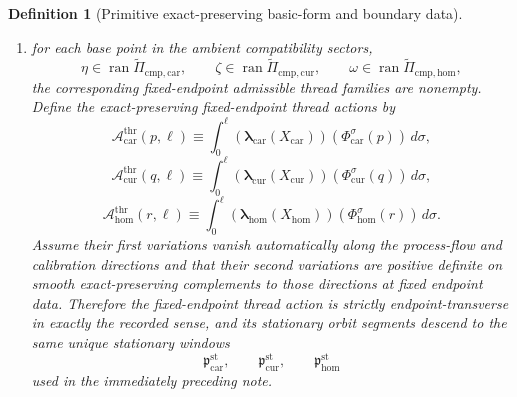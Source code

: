 \documentclass[11pt]{article}
\newcommand{\TensorEqCmpProj}{\widetilde\Pi_{\mathrm{cmp,car}}}
\newcommand{\CurEqCmpProj}{\widetilde\Pi_{\mathrm{cmp,cur}}}
\newcommand{\HomEqCmpProj}{\widetilde\Pi_{\mathrm{cmp,hom}}}
\newcommand{\TensorStationaryWindow}{\mathfrak p_{\mathrm{car}}^{\mathrm{st}}}
\newcommand{\CurStationaryWindow}{\mathfrak p_{\mathrm{cur}}^{\mathrm{st}}}
\newcommand{\HomStationaryWindow}{\mathfrak p_{\mathrm{hom}}^{\mathrm{st}}}
\newcommand{\CurBoundaryRecorder}{\rho_{\mathrm{cur}}^{\partial}}
\newcommand{\HomBoundaryRecorder}{\rho_{\mathrm{hom}}^{\partial}}
\newcommand{\TensorFlowField}{X_{\mathrm{car}}}
\newcommand{\CurFlowField}{X_{\mathrm{cur}}}
\newcommand{\HomFlowField}{X_{\mathrm{hom}}}
\newcommand{\TensorOrbitFlow}{\Phi_{\mathrm{car}}}
\newcommand{\CurOrbitFlow}{\Phi_{\mathrm{cur}}}
\newcommand{\HomOrbitFlow}{\Phi_{\mathrm{hom}}}
\newcommand{\TensorRateForm}{\boldsymbol{\lambda}_{\mathrm{car}}}
\newcommand{\CurRateForm}{\boldsymbol{\lambda}_{\mathrm{cur}}}
\newcommand{\HomRateForm}{\boldsymbol{\lambda}_{\mathrm{hom}}}
\newcommand{\CurBoundarySource}{\boldsymbol{\rho}_{\mathrm{cur}}^{\partial}}
\newcommand{\HomBoundarySource}{\boldsymbol{\rho}_{\mathrm{hom}}^{\partial}}
\newcommand{\TensorThreadAction}{\mathscr A_{\mathrm{car}}^{\mathrm{thr}}}
\newcommand{\CurThreadAction}{\mathscr A_{\mathrm{cur}}^{\mathrm{thr}}}
\newcommand{\HomThreadAction}{\mathscr A_{\mathrm{hom}}^{\mathrm{thr}}}
\newtheorem{definition}{Definition}
\begin{document}
\begin{definition}[Primitive exact-preserving basic-form and boundary data]
\begin{enumerate}
\begin{equation}
    \CurBoundaryRecorder((q,\ell),\sigma)
    \equiv
    \CurBoundarySource(\CurOrbitFlow^\sigma(q)),
    \label{eq:boundary_recorder_from_source_cur}
    \end{equation}
    \begin{equation}
    \HomBoundaryRecorder((r,\ell),\sigma)
    \equiv
    \HomBoundarySource(\HomOrbitFlow^\sigma(r)).
    \label{eq:boundary_recorder_from_source_hom}
    \end{equation}
    \item for each base point in the ambient compatibility sectors,
    \[
    \eta\in\operatorname{ran}\TensorEqCmpProj,\qquad
    \zeta\in\operatorname{ran}\CurEqCmpProj,\qquad
    \omega\in\operatorname{ran}\HomEqCmpProj,
    \]
    the corresponding fixed-endpoint admissible thread families are nonempty. Define the exact-preserving fixed-endpoint thread actions by
    \begin{equation}
    \TensorThreadAction(p,\ell)
    \equiv
    \int_0^\ell \left(\TensorRateForm(\TensorFlowField)\right)(\TensorOrbitFlow^\sigma(p))\,d\sigma,
    \label{eq:thread_action_car}
    \end{equation}
    \begin{equation}
    \CurThreadAction(q,\ell)
    \equiv
    \int_0^\ell \left(\CurRateForm(\CurFlowField)\right)(\CurOrbitFlow^\sigma(q))\,d\sigma,
    \label{eq:thread_action_cur}
    \end{equation}
    \begin{equation}
    \HomThreadAction(r,\ell)
    \equiv
    \int_0^\ell \left(\HomRateForm(\HomFlowField)\right)(\HomOrbitFlow^\sigma(r))\,d\sigma.
    \label{eq:thread_action_hom}
    \end{equation}
    Assume their first variations vanish automatically along the process-flow and calibration directions and that their second variations are positive definite on smooth exact-preserving complements to those directions at fixed endpoint data. Therefore the fixed-endpoint thread action is strictly endpoint-transverse in exactly the recorded sense, and its stationary orbit segments descend to the same unique stationary windows
    \[
    \TensorStationaryWindow,\qquad
    \CurStationaryWindow,\qquad
    \HomStationaryWindow
    \]
    used in the immediately preceding note.
\end{enumerate}
\end{definition}
\end{document}
